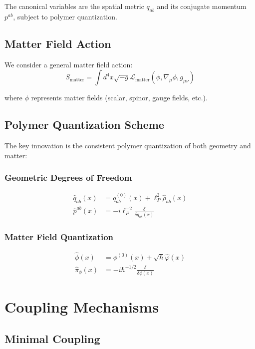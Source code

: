 \documentclass[11pt]{article}
\begin{document}
The canonical variables are the spatial metric $q_{ab}$ and its conjugate momentum $p^{ab}$, subject to polymer quantization.

\subsection{Matter Field Action}

We consider a general matter field action:
\begin{equation}
S_{\text{matter}} = \int d^4x \sqrt{-g} \mathcal{L}_{\text{matter}}(\phi, \nabla_\mu \phi, g_{\mu\nu})
\end{equation}

where $\phi$ represents matter fields (scalar, spinor, gauge fields, etc.).

\subsection{Polymer Quantization Scheme}

The key innovation is the consistent polymer quantization of both geometry and matter:

\subsubsection{Geometric Degrees of Freedom}
\begin{align}
\hat{q}_{ab}(x) &= q_{ab}^{(0)}(x) + \ell_P^2 \hat{\rho}_{ab}(x) \\
\hat{p}^{ab}(x) &= -i\ell_P^{-2} \frac{\delta}{\delta q_{ab}(x)}
\end{align}

\subsubsection{Matter Field Quantization}
\begin{align}
\hat{\phi}(x) &= \phi^{(0)}(x) + \sqrt{\hbar} \hat{\varphi}(x) \\
\hat{\pi}_\phi(x) &= -i\hbar^{-1/2} \frac{\delta}{\delta \phi(x)}
\end{align}

\section{Coupling Mechanisms}

\subsection{Minimal Coupling}
\end{document}
